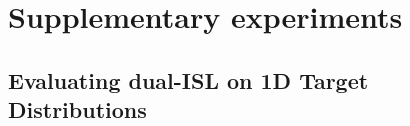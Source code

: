 \documentclass{article}
\newtheorem{theorem}{Theorem}[section]
\begin{document}

\newpage

\section{Supplementary experiments} \label{Supplementary experiments}

\subsection{Evaluating dual-ISL on 1D Target Distributions} \label{appendix: 1D experiments}
\end{document}
